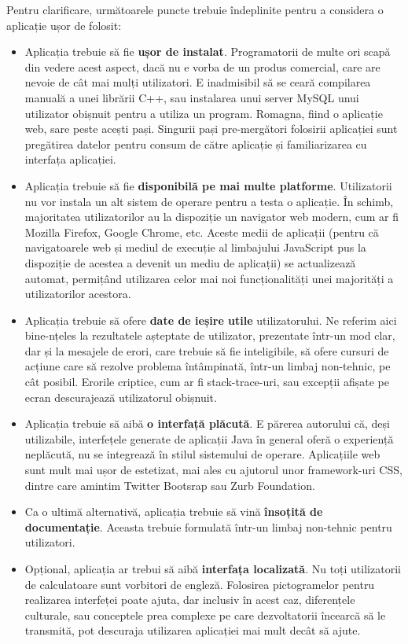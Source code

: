 \documentclass[12pt, a4paper, twoside, romanian]{teza-upb}
\begin{document}
      Pentru clarificare, următoarele puncte trebuie îndeplinite pentru a considera o aplicație ușor de folosit:
      \begin{itemize}
      \item Aplicația trebuie să fie \textbf{ușor de instalat}. Programatorii de multe ori scapă din vedere acest aspect, dacă nu e vorba de un produs comercial, care are nevoie de cât mai mulți utilizatori.
        E inadmisibil să se ceară compilarea manuală a unei librării C++, sau instalarea unui server MySQL unui utilizator obișnuit pentru a utiliza un program. Romagna, fiind o aplicație web, sare peste acești pași. Singurii pași pre-mergători folosirii aplicației sunt pregătirea datelor pentru consum de către aplicație și familiarizarea cu interfața aplicației.
      \item Aplicația trebuie să fie \textbf{disponibilă pe mai multe platforme}. Utilizatorii nu vor instala un alt sistem de operare pentru a testa o aplicație. 
        În schimb, majoritatea utilizatorilor au la dispoziție un navigator web modern, cum ar fi Mozilla Firefox, Google Chrome, etc. 
        Aceste medii de aplicații (pentru că navigatoarele web și mediul de execuție al limbajului JavaScript pus la dispoziție de acestea a devenit un mediu de aplicații) se actualizează automat, permițând utilizarea celor mai noi funcționalități unei majorități a utilizatorilor acestora.
        \item Aplicația trebuie să ofere \textbf{date de ieșire utile} utilizatorului. Ne referim aici bine-nțeles la rezultatele așteptate de utilizator, prezentate într-un mod clar, dar și la mesajele de erori, care trebuie să fie inteligibile, să ofere cursuri de acțiune care să rezolve problema întâmpinată, într-un limbaj non-tehnic, pe cât posibil.
          Erorile criptice, cum ar fi stack-trace-uri, sau excepții afișate pe ecran descurajează utilizatorul obișnuit.
        \item Aplicația trebuie să aibă \textbf{o interfață plăcută}. E părerea autorului că, deși utilizabile, interfețele generate de aplicații Java în general oferă o experiență neplăcută, nu se integrează în stilul sistemului de operare. Aplicațiile web sunt mult mai ușor de estetizat, mai ales cu ajutorul unor framework-uri CSS, dintre care amintim Twitter Bootsrap sau Zurb Foundation.
          \item Ca o ultimă alternativă, aplicația trebuie să vină \textbf{însoțită de documentație}. Aceasta trebuie formulată într-un limbaj non-tehnic pentru utilizatori. 
          \item Opțional, aplicația ar trebui să aibă \textbf{interfața localizată}. Nu toți utilizatorii de calculatoare sunt vorbitori de engleză. Folosirea pictogramelor pentru realizarea interfeței poate ajuta, dar inclusiv în acest caz, diferențele culturale, sau conceptele prea complexe pe care dezvoltatorii încearcă să le transmită, pot descuraja utilizarea aplicației mai mult decât să ajute.
      \end{itemize}
\end{document}
